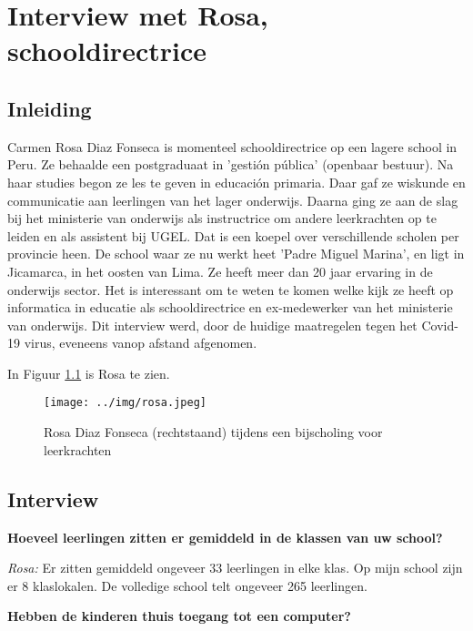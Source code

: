 
\chapter{Interview met Rosa, schooldirectrice}
\label{ch:interviewRosa}

\section{Inleiding}
Carmen Rosa Diaz Fonseca is momenteel schooldirectrice op een lagere school in Peru. Ze behaalde een postgraduaat in 'gestión pública' (openbaar bestuur). Na haar studies begon ze les te geven in educación primaria. Daar gaf ze wiskunde en communicatie aan leerlingen van het lager onderwijs. Daarna ging ze aan de slag bij het ministerie van onderwijs als instructrice om andere leerkrachten op te leiden en als assistent bij UGEL. Dat is een koepel over verschillende scholen per provincie heen. De school waar ze nu werkt heet 'Padre Miguel Marina', en ligt in Jicamarca, in het oosten van Lima. Ze heeft meer dan 20 jaar ervaring in de onderwijs sector. Het is interessant om te weten te komen welke kijk ze heeft op informatica in educatie als schooldirectrice en ex-medewerker van het ministerie van onderwijs. Dit interview werd, door de huidige maatregelen tegen het Covid-19 virus, eveneens vanop afstand afgenomen.

In Figuur \ref{rosa} is Rosa te zien.

\begin{figure}[h!]
	\texttt{[image: ../img/rosa.jpeg]}
	\caption{Rosa Diaz Fonseca (rechtstaand) tijdens een bijscholing voor leerkrachten }
	\label{rosa}
\end{figure}


\section{Interview}

\textbf{Hoeveel leerlingen zitten er gemiddeld in de klassen van uw school?}

\textit{Rosa:} Er zitten gemiddeld ongeveer 33 leerlingen in elke klas. Op mijn school zijn er 8 klaslokalen. De volledige school telt ongeveer 265 leerlingen.

\textbf{Hebben de kinderen thuis toegang tot een computer?}

